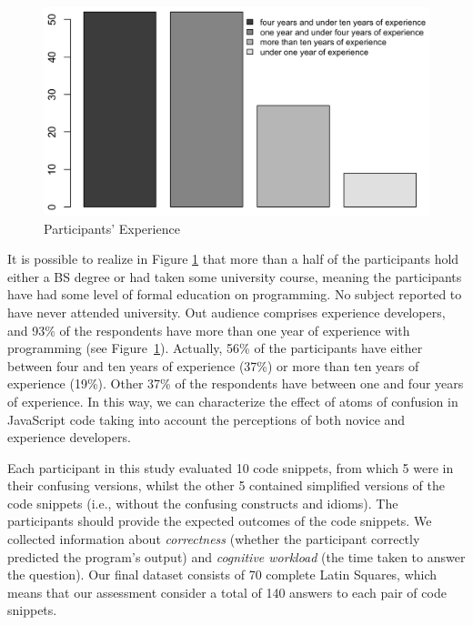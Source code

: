   \begin{figure}[htb]
      \centering
      \includegraphics[scale=.25]{images/experience.png}
      \caption{Participants' Experience} \label{fig:xp}
  \end{figure}

It is possible to realize in Figure \ref{fig:xp} that more than a half of the participants hold either a BS degree or had taken some university course, meaning the participants have had some level of formal education on programming. No subject reported to have never attended university. Out audience comprises experience developers, and 93\% of the respondents have more than one year of experience with programming (see Figure~\ref{fig:xp}). Actually, 56\% of the participants have either between four and ten years of experience (37\%) or more than ten years of experience (19\%). Other 37\% of the respondents have between one and four years of experience. In this way, we can characterize the effect of atoms of confusion in JavaScript code taking into account the perceptions of both novice and experience developers. 

Each participant in this study evaluated {\color{red}10} code snippets, from which 5 were in their confusing versions, whilst the other 5 contained simplified versions of the code snippets (i.e., without the confusing constructs and idioms). The participants should provide the expected outcomes of the code snippets. We collected information about \emph{correctness} (whether the participant correctly predicted the program's output) and \emph{cognitive workload} (the time taken to answer the question). Our final dataset consists of 70 complete Latin Squares, which means that our assessment consider a total of 140 answers to each pair of code snippets.


